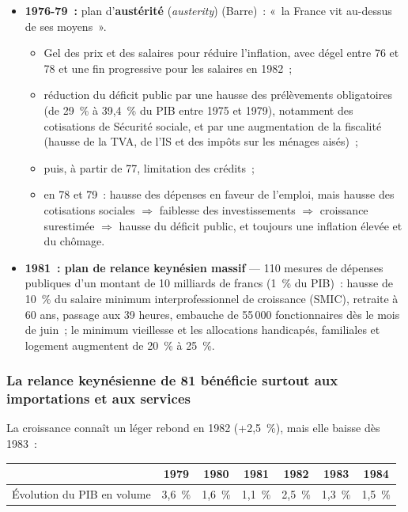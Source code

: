 \begin{itemize}
  \item \textbf{1976-79~:} plan d'\textbf{austérité} (\textit{austerity}) (Barre)~:
    «~la France vit au-dessus de ses moyens~».
    \begin{itemize}
      \item Gel des prix et des salaires pour réduire l'inflation, avec dégel entre 76 et
        78 et une fin progressive pour les salaires en 1982~;
      \item réduction du déficit public par une hausse des prélèvements obligatoires
        (de 29~\% à 39,4~\% du PIB entre 1975 et 1979), notamment des cotisations de
        Sécurité sociale, et par une augmentation de la fiscalité (hausse de la TVA, de l'IS et des impôts
        sur les ménages aisés)~;
      \item puis, à partir de 77, limitation des crédits~;
      \item en 78 et 79~: hausse des dépenses en faveur de l'emploi, mais hausse des
        cotisations sociales $\Rightarrow$ faiblesse des investissements $\Rightarrow$
        croissance surestimée $\Rightarrow$ hausse du déficit public, et toujours une
        inflation élevée et du chômage.
    \end{itemize}
  \item \textbf{1981~: plan de relance keynésien massif} --- 110 mesures de dépenses
    publiques d'un montant de 10 milliards de francs (1~\% du PIB)~: hausse de 10~\% du
    salaire minimum interprofessionnel de croissance (SMIC), retraite à 60 ans, passage
    aux 39 heures, embauche de 55\,000 fonctionnaires dès le mois de juin~; le minimum
    vieillesse et les allocations handicapés, familiales et logement augmentent de
    20~\% à 25~\%.
\end{itemize}

\subsubsection{La relance keynésienne de 81 bénéficie surtout aux importations et aux services}

La croissance connaît un léger rebond en 1982 (+2,5~\%), mais elle baisse dès 1983~:

\begin{center}
  \small
  \begin{tabular}{lcccccc}
    \toprule
    & 1979 & 1980 & 1981 & 1982 & 1983 & 1984 \\
    \midrule
    Évolution du PIB en volume & 3,6~\% & 1,6~\% & 1,1~\% & 2,5~\% & 1,3~\% & 1,5~\% \\
    \bottomrule
  \end{tabular}
\end{center}

